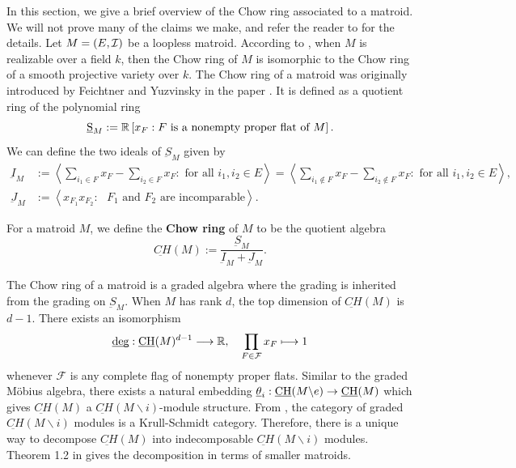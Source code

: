 \documentclass{puthesis-UG}
\begin{document}
In this section, we give a brief overview of the Chow ring associated to a matroid. We will not prove many of the claims we make, and refer the reader to \cite{huh-semi-small} for the details. Let $M = (E, \mathcal{I})$ be a loopless matroid. According to \cite{huh-semi-small}, when $M$ is realizable over a field $k$, then the Chow ring of $M$ is isomorphic to the Chow ring of a smooth projective variety over $k$. The Chow ring of a matroid was originally introduced by Feichtner and Yuzvinsky in the paper \cite{Feichtner_2004}. It is defined as a quotient ring of the polynomial ring 
\[	
	\underbar{S}_M := \mathbb{R} \left [ x_F : F \text{ is a nonempty proper flat of } M \right ].
\]
We can define the two ideals of $\underbar{S}_M$ given by 
\begin{align*}
	\underbar{I}_M & := \left \langle \sum_{i_1 \in F} x_F - \sum_{i_2 \in F} x_F : \text{ for all } i_1, i_2 \in E \right \rangle = \left \langle \sum_{i_1 \notin F} x_F - \sum_{i_2 \notin F} x_F : \text{ for all } i_1, i_2 \in E \right \rangle,  \\
	\underbar{J}_M & := \left \langle x_{F_1} x_{F_2} : \text{ $F_1$ and $F_2$ are incomparable}  \right \rangle.
\end{align*}

\begin{defn} \label{def:chow-ring-matroid}
	For a matroid $M$, we define the \textbf{Chow ring} of $M$ to be the quotient algebra 
	\[
		\underbar{CH} (M) := \frac{\underbar{S}_M}{\underbar{I}_M + \underbar{J}_M}. 
	\]
\end{defn}

The Chow ring of a matroid is a graded algebra where the grading is inherited from the grading on $\underbar{S}_M$. When $M$ has rank $d$, the top dimension of $\underbar{CH} (M)$ is $d-1$. There exists an isomorphism 
\[
	\underbar{deg} : \underbar{CH} (M)^{d-1} \longrightarrow \mathbb{R}, \quad \prod_{F \in \mathcal{F}} x_F \longmapsto 1
\]
whenever $\mathcal{F}$ is any complete flag of nonempty proper flats. Similar to the graded M\"obius algebra, there exists a natural embedding $\underbar{$\theta$}_i : \underbar{CH}(M \backslash e) \to \underbar{CH}(M)$ which gives $\underbar{CH}(M)$ a $\underbar{CH}(M \backslash i)$-module structure. From \cite{krull-schmidt}, the category of graded $\underbar{CH}(M \backslash i)$ modules is a Krull-Schmidt category. Therefore, there is a unique way to decompose $\underbar{CH}(M)$ into indecomposable $\underbar{CH}(M \backslash i)$ modules. Theorem 1.2 in \cite{huh-semi-small} gives the decomposition in terms of smaller matroids. 
\end{document}
